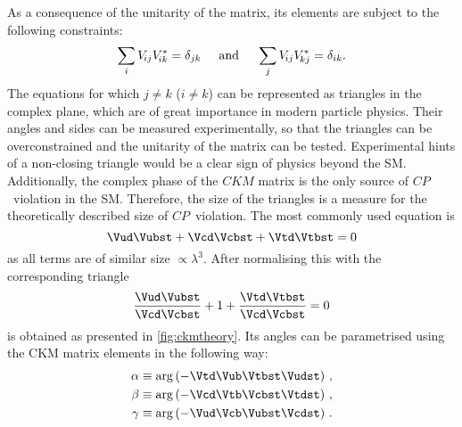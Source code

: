 As a consequence of the unitarity of the matrix, its elements are subject to the following constraints:
\begin{equation}
\sum_{i} V_{{\kern -0.1em}ij}V_{{\kern -0.1em}ik}^{*} = \delta_{jk}\hspace{0.5cm}\text{and}\hspace{0.5cm}
\sum_{j} V_{{\kern -0.1em}ij}V_{{\kern -0.1em}kj}^{*} = \delta_{ik}\label{eq:CKMtriangleEquations}.
\end{equation}
The equations for which $j\!\neq\!k$ ($i\!\neq\!k$) can be represented as triangles in the complex plane, which are of great importance in modern particle physics.
Their angles and sides can be measured experimentally, so that the triangles can be overconstrained and the unitarity of the matrix can be tested.
Experimental hints of a non-closing triangle would be a clear sign of physics beyond the \ac{SM}.
Additionally, the complex phase of the $CKM$ matrix is the only source of \mbox{$CP$ violation} in the \ac{SM}.
Therefore, the size of the triangles is a measure for the theoretically described size of \mbox{$CP$ violation}.
The most commonly used equation is
\begin{equation}
\Vud\Vubst + \Vcd\Vcbst + \Vtd\Vtbst = 0
\end{equation}
as all terms are of similar size $\propto\lambda^3$.
After normalising this with \Vcd\Vcbst the corresponding triangle
\begin{equation}
\frac{\Vud\Vubst}{\Vcd\Vcbst} + 1 + \frac{\Vtd\Vtbst}{\Vcd\Vcbst} = 0 \label{eq:CKMtriangle}
\end{equation}
is obtained as presented in \cref{fig:ckmtheory}.
Its angles can be parametrised using the CKM matrix elements in the following way:
\begin{equation}
\begin{aligned}
\alpha&\equiv\arg\left(-\Vtd\Vub\Vtbst\Vudst\right)\,,\\
\beta&\equiv\arg\left(-\Vcd\Vtb\Vcbst\Vtdst\right)\,,\\
\gamma&\equiv\arg\left(-\Vud\Vcb\Vubst\Vcdst\right)\,.\label{eq:CKMangles}
\end{aligned}
\end{equation}
